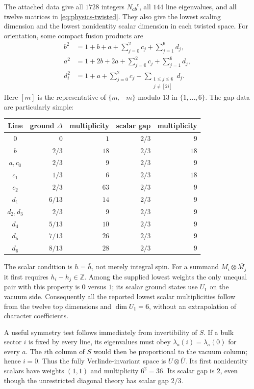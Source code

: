 \documentclass[11pt,a4paper]{article}
\theoremstyle{definition}
\begin{document}
The attached data give all $1728$ integers $N_{ab}^{\phantom{ab}c}$,
all $144$ line eigenvalues, and all twelve matrices in
\eqref{eq:physics-twisted}. They also give the lowest scaling dimension
and the lowest nonidentity scalar dimension in each twisted space.
For orientation, some compact fusion products are
\begin{align}
 b^2&=1+b+a+\sum_{j=0}^2c_j+\sum_{j=1}^6d_j,\\
 a^2&=1+2b+2a+\sum_{j=0}^2c_j+\sum_{j=1}^6d_j,\\
 d_i^2&=1+a+\sum_{j=0}^2c_j+
                 \sum_{\substack{1\leq j\leq6\\j\ne[2i]}}d_j.
\end{align}
Here $[m]$ is the representative of $\{m,-m\}$ modulo $13$ in
$\{1,\ldots,6\}$. The gap data are particularly simple:
\begin{center}
\begin{tabular}{c|rr|rr}
\toprule
Line&ground $\Delta$&multiplicity&scalar gap&multiplicity\\
\midrule
$0$&$0$&$1$&$2/3$&$9$\\
$b$&$2/3$&$18$&$2/3$&$18$\\
$a,c_0$&$2/3$&$9$&$2/3$&$9$\\
$c_1$&$1/3$&$6$&$2/3$&$18$\\
$c_2$&$2/3$&$63$&$2/3$&$9$\\
$d_1$&$6/13$&$14$&$2/3$&$9$\\
$d_2,d_3$&$2/3$&$9$&$2/3$&$9$\\
$d_4$&$5/13$&$10$&$2/3$&$9$\\
$d_5$&$7/13$&$26$&$2/3$&$9$\\
$d_6$&$8/13$&$28$&$2/3$&$9$\\
\bottomrule
\end{tabular}
\end{center}
The scalar condition is $h=\bar h$, not merely integral spin.
For a summand $M_i\otimes\overline{M_j}$ it first requires
$h_i-h_j\in\mathbb Z$. Among the supplied lowest weights the only
unequal pair with this property is $0$ versus $1$; its scalar ground
states use $U_1$ on the vacuum side. Consequently all the reported
lowest scalar multiplicities follow from the twelve top dimensions and
$\dim U_1=6$, without an extrapolation of character coefficients.

A useful symmetry test follows immediately from invertibility of $S$.
If a bulk sector $i$ is fixed by every line, its eigenvalues must obey
$\lambda_a(i)=\lambda_a(0)$ for every $a$. The $i$th column of $S$
would then be proportional to the vacuum column; hence $i=0$.
Thus the fully Verlinde-invariant space is
$U\otimes\overline U$. Its first nonidentity scalars have weights
$(1,1)$ and multiplicity $6^2=36$. Its scalar gap is $2$, even though
the unrestricted diagonal theory has scalar gap $2/3$.
\end{document}
